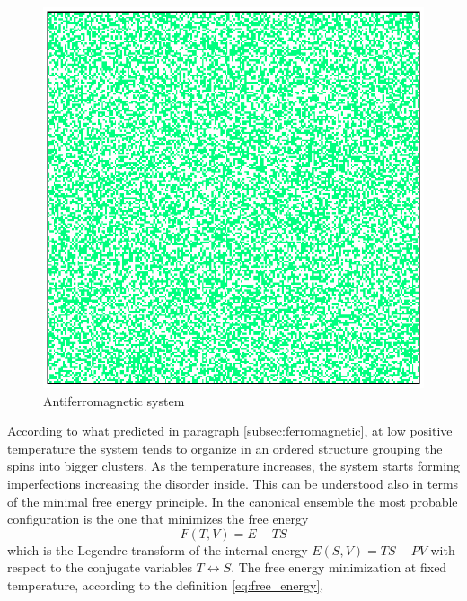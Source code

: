 \begin{figure}[h]
\begin{minipage}[c]{0.45\textwidth}
    \end{minipage}
    \hfill
    \begin{minipage}[c]{\textwidth}
        \centering
        \includegraphics[scale=0.45]{./images/ising/T_100_antiferro.eps}
    \end{minipage}
    \centering 
    \caption{Antiferromagnetic system}
    \label{fig:MC_single_final_state_antiferro}
\end{figure}
According to what predicted in paragraph \ref{subsec:ferromagnetic}, at low positive temperature the system tends to organize
in an ordered structure grouping the spins into bigger clusters. As the temperature increases, the system starts forming imperfections increasing the disorder inside. This can be understood 
also in terms of the minimal free energy principle. In the canonical ensemble the most probable configuration is the one that minimizes the free energy
\begin{equation}
    F(T, V) = E - TS
    \label{eq:free_energy}
\end{equation}
which is the Legendre transform of the internal energy $E(S, V) = TS - PV$ with respect to the conjugate variables $T \leftrightarrow S$. The free energy minimization at fixed temperature, according to the definition \ref{eq:free_energy},
